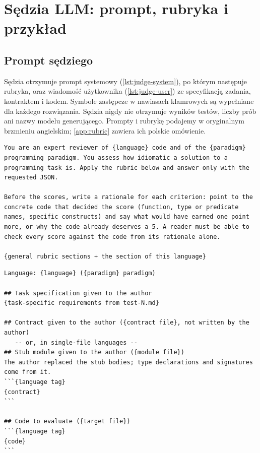 \chapter{Sędzia LLM: prompt, rubryka i przykład}
\label{app:judge}

\section{Prompt sędziego}

Sędzia otrzymuje prompt systemowy (\cref{lst:judge-system}), po którym następuje rubryka, oraz
wiadomość użytkownika (\cref{lst:judge-user}) ze specyfikacją zadania, kontraktem i kodem. Symbole
zastępcze w nawiasach klamrowych są wypełniane dla każdego rozwiązania. Sędzia nigdy nie otrzymuje
wyników testów, liczby prób ani nazwy modelu generującego. Prompty i rubrykę podajemy
w oryginalnym brzmieniu angielskim; \cref{app:rubric} zawiera ich polskie omówienie.

\begin{lstlisting}[style=prompt,caption={Prompt systemowy sędziego (\file{harness/judge.py}).},label={lst:judge-system}]
You are an expert reviewer of {language} code and of the {paradigm} programming paradigm. You assess how idiomatic a solution to a programming task is. Apply the rubric below and answer only with the requested JSON.

Before the scores, write a rationale for each criterion: point to the concrete code that decided the score (function, type or predicate names, specific constructs) and say what would have earned one point more, or why the code already deserves a 5. A reader must be able to check every score against the code from its rationale alone.

{general rubric sections + the section of this language}
\end{lstlisting}

\begin{lstlisting}[style=prompt,caption={Struktura wiadomości użytkownika dla sędziego.},label={lst:judge-user}]
Language: {language} ({paradigm} paradigm)

## Task specification given to the author
{task-specific requirements from test-N.md}

## Contract given to the author ({contract file}, not written by the author)
   -- or, in single-file languages --
## Stub module given to the author ({module file})
The author replaced the stub bodies; type declarations and signatures come from it.
```{language tag}
{contract}
```

## Code to evaluate ({target file})
```{language tag}
{code}
```
\end{lstlisting}

